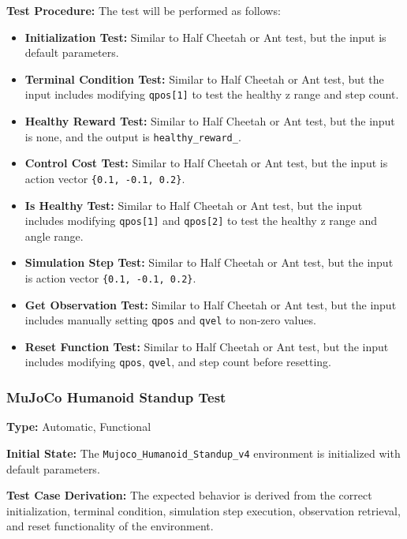 \documentclass[12pt, titlepage]{article}
\begin{document}
\textbf{Test Procedure:} The test will be performed as follows:
\begin{itemize}
    \item \textbf{Initialization Test:} Similar to Half Cheetah or Ant test, but the input is default parameters.
    
    \item \textbf{Terminal Condition Test:} Similar to Half Cheetah or Ant test, but the input includes modifying \texttt{qpos[1]} to test the healthy z range and step count.
    
    \item \textbf{Healthy Reward Test:} Similar to Half Cheetah or Ant test, but the input is none, and the output is \texttt{healthy\_reward\_}.
    
    \item \textbf{Control Cost Test:} Similar to Half Cheetah or Ant test, but the input is action vector \texttt{\{0.1, -0.1, 0.2\}}.
    
    \item \textbf{Is Healthy Test:} Similar to Half Cheetah or Ant test, but the input includes modifying \texttt{qpos[1]} and \texttt{qpos[2]} to test the healthy z range and angle range.
    
    \item \textbf{Simulation Step Test:} Similar to Half Cheetah or Ant test, but the input is action vector \texttt{\{0.1, -0.1, 0.2\}}.
    
    \item \textbf{Get Observation Test:} Similar to Half Cheetah or Ant test, but the input includes manually setting \texttt{qpos} and \texttt{qvel} to non-zero values.
    
    \item \textbf{Reset Function Test:} Similar to Half Cheetah or Ant test, but the input includes modifying \texttt{qpos}, \texttt{qvel}, and step count before resetting.
\end{itemize}

\subsubsection{MuJoCo Humanoid Standup Test}

\textbf{Type:} Automatic, Functional

\textbf{Initial State:} The \texttt{Mujoco\_Humanoid\_Standup\_v4} environment is initialized with default parameters.

\textbf{Test Case Derivation:} The expected behavior is derived from the correct initialization, terminal condition, simulation step execution, observation retrieval, and reset functionality of the environment.
\end{document}

